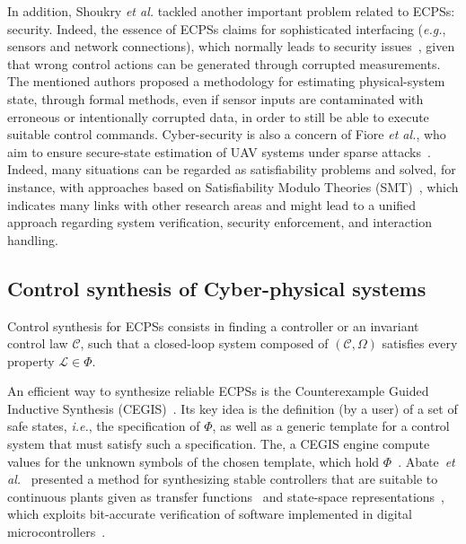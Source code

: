 \documentclass[format=acmsmall, review=false, screen=true]{acmart}
\begin{document}
In addition, Shoukry {\it et al.} \cite{Shoukry} tackled another important problem related to ECPSs: security. Indeed, the essence of ECPSs claims for sophisticated interfacing ({\it e.g.}, sensors and network connections), which normally leads to security issues~\cite{cpsattack}, given that wrong control actions can be generated through corrupted measurements. The mentioned authors proposed a methodology for estimating physical-system state, through formal methods, even if sensor inputs are contaminated with erroneous or intentionally corrupted data, in order to still be able to execute suitable control commands. Cyber-security is also a concern of Fiore {\it et al.}, who aim to ensure secure-state estimation of UAV systems under sparse attacks~\cite{Fiore17}. Indeed, many situations can be regarded as satisfiability problems and solved, for instance, with approaches based on Satisfiability Modulo Theories (SMT)~\cite{Araujo16,TrindadeDAES2016,Rahman13}, which indicates many links with other research areas and might lead to a unified approach regarding system verification, security enforcement, and interaction handling.

\subsection{Control synthesis of Cyber-physical systems}
\label{ssec:synthesis}

Control synthesis for ECPSs consists in finding a controller or an invariant control law $\mathcal{C}$, such that a closed-loop system composed of $(\mathcal{C},\Omega)$ satisfies every property $\mathcal{L}\in \Phi$. 

An efficient way to synthesize reliable ECPSs is the Counterexample Guided Inductive Synthesis (CEGIS)~\cite{David15}. Its key idea is the definition (by a user) of a set of safe states, {\it i.e.}, the specification of $\Phi$, as well as a generic template for a control system that must satisfy such a specification. The, a CEGIS engine compute values for the unknown symbols of the chosen template, which hold $\Phi$~\cite{RienerKFB16}. Abate~{\it et al.}~\cite{Abate17,abatecav2017} presented a method for synthesizing stable controllers that are suitable to continuous plants given as transfer functions~\cite{Abate17} and state-space representations~\cite{abatecav2017}, which exploits bit-accurate verification of software implemented in digital microcontrollers~\cite{Bessa16,Bessa17,dsv_spin2015}.
\end{document}
